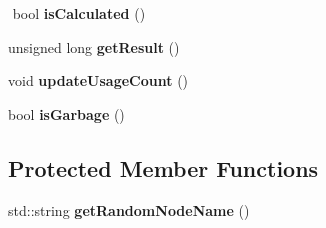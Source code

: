 \begin{DoxyCompactItemize}
$$\mbox{\label{classathena_1_1core_1_1_node_af75ed35cf7ec81f686292b1cef4c549d}} 
bool {\bfseries is\+Calculated} ()
\item 
\mbox{\label{classathena_1_1core_1_1_node_ae2568f40260ef891d79618c16d2fc1a8}} 
unsigned long {\bfseries get\+Result} ()
\item 
\mbox{\label{classathena_1_1core_1_1_node_ae160501f8419f9874bd71aefe6daa3dc}} 
void {\bfseries update\+Usage\+Count} ()
\item 
\mbox{\label{classathena_1_1core_1_1_node_ad0e6344fe6940e59d79eb4b05a7a5b96}} 
bool {\bfseries is\+Garbage} ()
\end{DoxyCompactItemize}
\subsection*{Protected Member Functions}
\begin{DoxyCompactItemize}
\item 
\mbox{\label{classathena_1_1core_1_1_node_aa2aee4b3d80299df55739295d8f7040a}} 
std\+::string {\bfseries get\+Random\+Node\+Name} ()
\end{DoxyCompactItemize}
